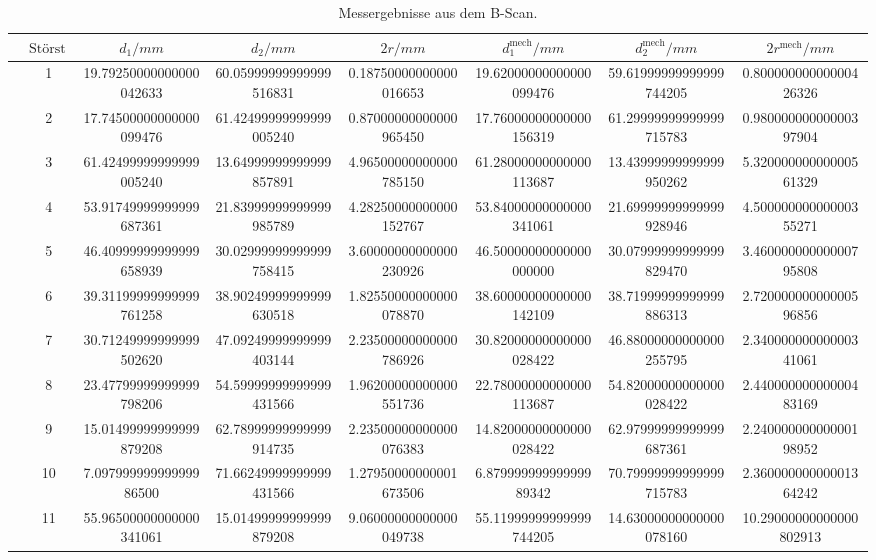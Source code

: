 \begin{table}
        \caption{Messergebnisse aus dem B-Scan.}
        \centering
        \label{tab:b}
        \begin{tabular}{l@{}S[round-mode=off, table-format=2.0]S[table-format=2.3, round-precision=2, round-mode=places] S[table-format=2.2, round-precision=4, round-mode=figures] S[table-format=1.4, round-precision=4, round-mode=figures] S[table-format=2.3, round-precision=4, round-mode=figures] S[table-format=2.2, round-precision=4, round-mode=figures] S[table-format=2.4, round-precision=2, round-mode=places] } \toprule & {$\text{Störstelle}$}& {$d_1/\si{mm}$}& {$d_2/\si{mm}$}& {$2r/\si{mm}$}& {$d_1^\text{mech}/\si{mm}$}& {$d_2^\text{mech}/\si{mm}$}& {$2r^\text{mech}/\si{mm}$}\\\midrule& 1 & 19.79250000000000042633 & 60.05999999999999516831 & 0.18750000000000016653 & 19.62000000000000099476 & 59.61999999999999744205 & 0.80000000000000426326 \\
& 2 & 17.74500000000000099476 & 61.42499999999999005240 & 0.87000000000000965450 & 17.76000000000000156319 & 61.29999999999999715783 & 0.98000000000000397904 \\
& 3 & 61.42499999999999005240 & 13.64999999999999857891 & 4.96500000000000785150 & 61.28000000000000113687 & 13.43999999999999950262 & 5.32000000000000561329 \\
& 4 & 53.91749999999999687361 & 21.83999999999999985789 & 4.28250000000000152767 & 53.84000000000000341061 & 21.69999999999999928946 & 4.50000000000000355271 \\
& 5 & 46.40999999999999658939 & 30.02999999999999758415 & 3.60000000000000230926 & 46.50000000000000000000 & 30.07999999999999829470 & 3.46000000000000795808 \\
& 6 & 39.31199999999999761258 & 38.90249999999999630518 & 1.82550000000000078870 & 38.60000000000000142109 & 38.71999999999999886313 & 2.72000000000000596856 \\
& 7 & 30.71249999999999502620 & 47.09249999999999403144 & 2.23500000000000786926 & 30.82000000000000028422 & 46.88000000000000255795 & 2.34000000000000341061 \\
& 8 & 23.47799999999999798206 & 54.59999999999999431566 & 1.96200000000000551736 & 22.78000000000000113687 & 54.82000000000000028422 & 2.44000000000000483169 \\
& 9 & 15.01499999999999879208 & 62.78999999999999914735 & 2.23500000000000076383 & 14.82000000000000028422 & 62.97999999999999687361 & 2.24000000000000198952 \\
& 10 & 7.09799999999999986500 & 71.66249999999999431566 & 1.27950000000001673506 & 6.87999999999999989342 & 70.79999999999999715783 & 2.36000000000001364242 \\
& 11 & 55.96500000000000341061 & 15.01499999999999879208 & 9.06000000000000049738 & 55.11999999999999744205 & 14.63000000000000078160 & 10.29000000000000802913 \\
 \bottomrule \end{tabular} \end{table}
